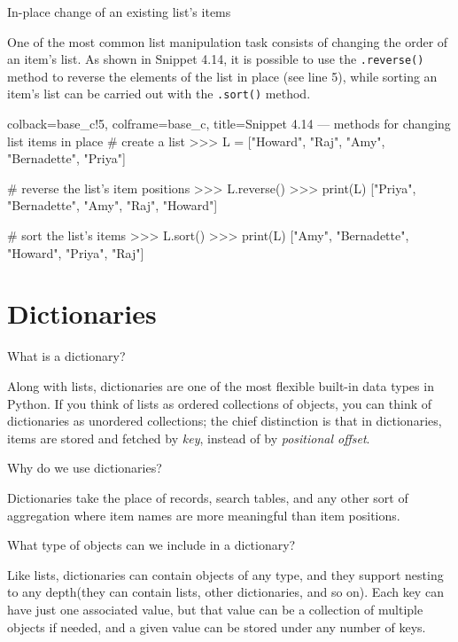 \documentclass[a4paper,11pt]{book}
\numberwithin{figure}{chapter}
\numberwithin{table}{chapter}
\newcommand{\question}[1]{%
    \begin{tcolorbox}[colback=comp_c!10,colframe=comp_c,sidebyside align=top,width=\linewidth,before skip=1ex]
        #1
    \end{tcolorbox}%
    \switchcolumn%
}
\newcommand{\note}[1]{%
    \begin{tcolorbox}[colback=white!0,colframe=white!10,width=\linewidth,before skip=1ex]
        #1
    \end{tcolorbox}         
}
\begin{document}
\begin{paracol}{2}
	\question{\raggedright In-place change of an existing list's items}
	\note{One of the most common list manipulation task consists of changing the order of an item's list. As shown in Snippet 4.14, it is possible to use the \texttt{.reverse()} method to reverse the elements of the list in place (see line 5), while sorting an item's list can be carried out with the \texttt{.sort()} method.}
\end{paracol}

\begin{pythoncode}[linenos=true,]{colback=base_c!5, colframe=base_c, title=\sffamily Snippet 4.14 --- methods for changing list items in place}
# create a list 
>>> L = ["Howard", "Raj", "Amy", "Bernadette", "Priya"]

# reverse the list's item positions
>>> L.reverse()
>>> print(L)
["Priya", "Bernadette", "Amy", "Raj", "Howard"]

# sort the list's items
>>> L.sort()
>>> print(L)
["Amy", "Bernadette", "Howard", "Priya", "Raj"]

\end{pythoncode}
\clearpage

\section{Dictionaries}
\label{sec:dictionaries}

\begin{paracol}{2}
	\question{\raggedright What is a dictionary?}
	\note{Along with lists, dictionaries are one of the most flexible built-in data types in Python. If you think of lists as ordered collections of objects, you can think of dictionaries as unordered collections; the chief distinction is that in dictionaries, items are stored and fetched by \emph{key}, instead of by \emph{positional offset}.}
\end{paracol}

\begin{paracol}{2}
	\question{\raggedright Why do we use dictionaries?}
	\note{Dictionaries take the place of records, search tables, and any other sort of aggregation where item names are more meaningful than item positions.}
\end{paracol}

\begin{paracol}{2}
	\question{\raggedright What type of objects can we include in a dictionary?}
	\note{Like lists, dictionaries can contain objects of any type, and they support nesting to any depth(they can contain lists, other dictionaries, and so on). Each key can have just one associated value, but that value can be a collection of multiple objects if needed, and a given value can be stored under any number of keys.}
\end{paracol}
\end{document}
